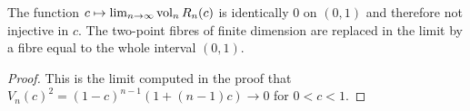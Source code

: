 \begin{theorem}\label{thm:main}
The function $c\mapsto\lim_{n\to\infty}\operatorname{vol}_nR_n(c)$ is identically $0$ on $(0,1)$ and therefore not injective in $c$. The two-point fibres of finite dimension are replaced in the limit by a fibre equal to the whole interval $(0,1)$.
\end{theorem}
\begin{proof}
This is the limit computed in the proof that $V_n(c)^2=(1-c)^{n-1}(1+(n-1)c)\to0$ for $0<c<1$.
\end{proof}
